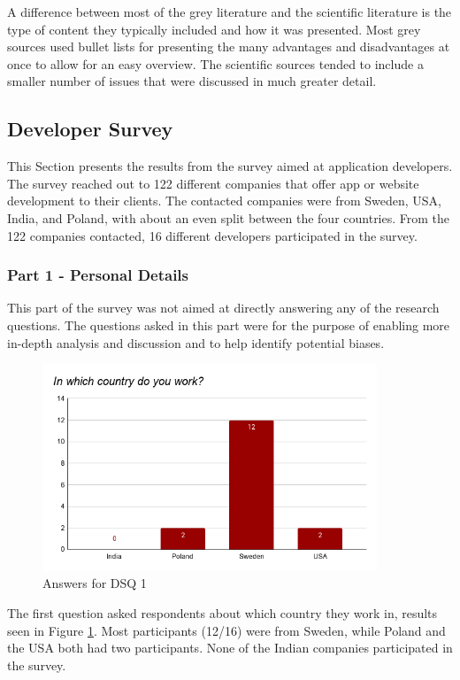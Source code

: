 \documentclass[a4paper,12pt]{article}
\begin{document}
A difference between most of the grey literature and the scientific literature is the type of content they typically included and how it was presented. Most grey sources used bullet lists for presenting the many advantages and disadvantages at once to allow for an easy overview. The scientific sources tended to include a smaller number of issues that were discussed in much greater detail.

\subsection{Developer Survey}
\label{Results_dev}
This Section presents the results from the survey aimed at application developers. The survey reached out to 122 different companies that offer app or website development to their clients. The contacted companies were from Sweden, USA, India, and Poland, with about an even split between the four countries. From the 122 companies contacted, 16 different developers participated in the survey.

\subsubsection{Part 1 - Personal Details}
\label{Results_dev_part1}
This part of the survey was not aimed at directly answering any of the research questions. The questions asked in this part were for the purpose of enabling more in-depth analysis and discussion and to help identify potential biases.

\begin{figure}[ht!]
    \centering
    \includegraphics[width=10cm]{img/Results/dsq1.png}
    \caption{Answers for DSQ 1}
    \label{fig:res_devq1}
\end{figure}

The first question asked respondents about which country they work in, results seen in Figure \ref{fig:res_devq1}. Most participants (12/16) were from Sweden, while Poland and the USA both had two participants. None of the Indian companies participated in the survey.
\end{document}
